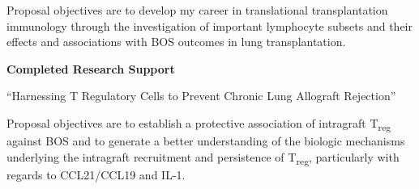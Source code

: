 \documentclass[11pt]{nih-blank}%
\numberwithin{equation}{subsection}
\numberwithin{figure}{subsection}
\numberwithin{table}{subsection}
\begin{document}
Proposal objectives are to develop my career in translational transplantation immunology through the investigation of important lymphocyte subsets and their effects and associations with {\smaller BOS} outcomes in lung transplantation.


\vspace{0.5cm} \par %
\textbf{Completed Research Support}

\begin{parcolumns}[colwidths={1=5in,2=2in}]{2}

\end{parcolumns}
``Harnessing T Regulatory Cells to Prevent Chronic Lung Allograft Rejection''

Proposal objectives are to establish a protective association of intragraft T\textsubscript{reg} against {\smaller BOS} and to generate a better understanding of the biologic mechanisms underlying the intragraft recruitment and persistence of T\textsubscript{reg}, particularly with regards to {\smaller CCL}21/{\smaller CCL}19 and {\smaller IL}-1.




\end{document}
